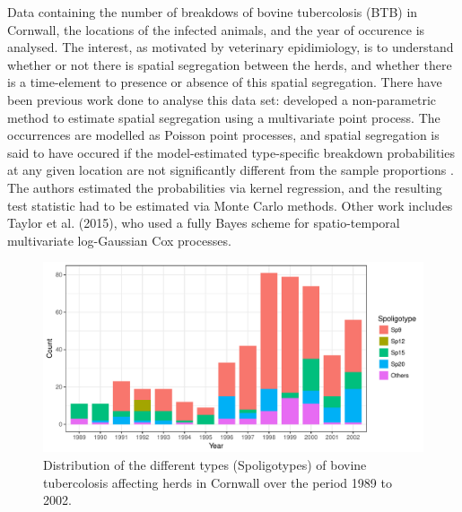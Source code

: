 \documentclass[a4paper,showframe,11pt]{report}\usepackage[]{graphicx}\usepackage[]{color}
\newenvironment{knitrout}{}{} %
\begin{document}
Data containing the number of breakdows of bovine tubercolosis (BTB) in Cornwall, the locations of the infected animals, and the year of occurence is analysed.
The interest, as motivated by veterinary epidimiology, is to understand whether or not there is spatial segregation between the herds, and whether there is a time-element to presence or absence of this spatial segregation.
There have been previous work done to analyse this data set:  developed a non-parametric method to estimate spatial segregation using a multivariate point process.
The occurrences are modelled as Poisson point processes, and spatial segregation is said to have occured if the model-estimated type-specific breakdown probabilities at any given location are not significantly different from the sample proportions .
The authors estimated the probabilities via kernel regression, and the resulting test statistic had to be estimated via Monte Carlo methods.
Other work includes Taylor et al. (2015), who used a fully Bayes scheme for spatio-temporal multivariate log-Gaussian Cox processes.

\begin{knitrout}
\color{fgcolor}\begin{figure}[h]

{\centering \includegraphics[width=\linewidth]{figure/plot_cow-1} 

}

\caption[Distribution of the different types (Spoligotypes) of bovine tubercolosis affecting herds in Cornwall over the period 1989 to 2002]{Distribution of the different types (Spoligotypes) of bovine tubercolosis affecting herds in Cornwall over the period 1989 to 2002.}\label{fig:plot.cow}
\end{figure}


\end{knitrout}
\end{document}
